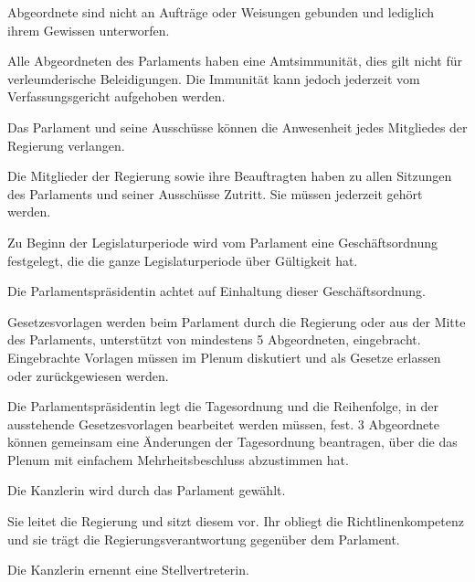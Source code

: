 \documentclass{sasbase}
\begin{document}
\begin{article}[Abgeordnete]
	\item Abgeordnete sind nicht an Aufträge oder Weisungen gebunden und lediglich ihrem Gewissen unterworfen.
	\item Alle Abgeordneten des Parlaments haben eine Amtsimmunität, dies gilt nicht für verleumderische Beleidigungen. Die Immunität kann jedoch jederzeit vom Verfassungsgericht aufgehoben werden.
\end{article}

\begin{article}
	\item Das Parlament und seine Ausschüsse können die Anwesenheit jedes Mitgliedes der Regierung verlangen.
	\item Die Mitglieder der Regierung sowie ihre Beauftragten haben zu allen Sitzungen des Parlaments und seiner Ausschüsse Zutritt. Sie müssen jederzeit gehört werden.
\end{article}

\begin{article}
	\item Zu Beginn der Legislaturperiode wird vom Parlament eine Geschäftsordnung festgelegt, die die ganze Legislaturperiode über Gültigkeit hat.
	\item Die Parlamentspräsidentin achtet auf Einhaltung dieser Geschäftsordnung.
	\item Gesetzesvorlagen werden beim Parlament durch die Regierung oder aus der Mitte des Parlaments, unterstützt von mindestens 5 Abgeordneten, eingebracht. Eingebrachte Vorlagen müssen im Plenum diskutiert und als Gesetze erlassen oder zurückgewiesen werden.
	\item Die Parlamentspräsidentin legt die Tagesordnung und die Reihenfolge, in der ausstehende Gesetzesvorlagen bearbeitet werden müssen, fest. 3 Abgeordnete können gemeinsam eine Änderungen der Tagesordnung beantragen, über die das Plenum mit einfachem Mehrheitsbeschluss abzustimmen hat.
\end{article}


\begin{article}[Kanzlerin]
	\item Die Kanzlerin wird durch das Parlament gewählt.
	\item Sie leitet die Regierung und sitzt diesem vor. Ihr obliegt die Richtlinenkompetenz und sie trägt die Regierungsverantwortung gegenüber dem Parlament.
	\item Die Kanzlerin ernennt eine Stellvertreterin.
\end{article}
\end{document}
